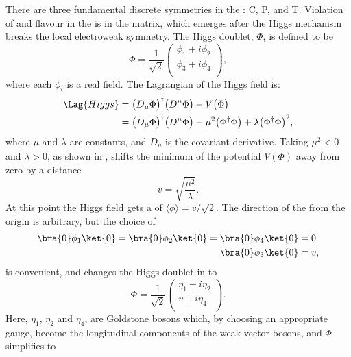 There are three fundamental discrete symmetries in the \sm: \gls{C}, \gls{P}, and \gls{T}.
Violation of \CP and flavour in the \sm is in the \ckm matrix, which emerges
after the Higgs mechanism breaks the local electroweak symmetry.
The Higgs doublet, $\Phi$, is defined to be
\begin{equation}
  \Phi = \frac{1}{\sqrt{2}}
  \begin{pmatrix}
    \phi_1 + i\phi_2 \\
    \phi_3 + i\phi_4 \\
  \end{pmatrix},
  \label{eq:th:phi}
\end{equation}
where each $\phi_i$ is a real field.
The Lagrangian of the Higgs field is:
\begin{align}
  \Lag{Higgs}
  &= \big(D_\mu\Phi\big)^\dagger\big(D^\mu\Phi\big) - V\big(\Phi\big) \nonumber\\
  &= \big(D_\mu\Phi\big)^\dagger\big(D^\mu\Phi\big) - \mu^2\big(\Phi^\dagger\Phi\big) +
  \lambda\big(\Phi^\dagger\Phi\big)^{2},
  \label{eq:th:laghiggs1}
\end{align}
where $\mu$ and $\lambda$ are constants, and $D_\mu$ is the covariant derivative.
Taking $\mu^2<0$ and $\lambda>0$,
as shown in ,
shifts the minimum of the potential $V(\Phi)$ away from zero by a
distance
\begin{equation}
  v = \sqrt{\frac{\mu^2}{\lambda}}.
\end{equation}
At this point the Higgs field gets a \VEV of $\langle\phi\rangle = v/\sqrt{2}$.
The direction of the \VEV from the origin is arbitrary, but the choice of
\begin{align}
  \bra{0}\phi_1\ket{0} =
  \bra{0}\phi_2\ket{0} =
  \bra{0}\phi_4\ket{0} &= 0 \nonumber\\
  \bra{0}\phi_3\ket{0} &= v,
\end{align}
is convenient, and changes the Higgs doublet in  to
\begin{equation}
  \Phi = \frac{1}{\sqrt{2}}
  \begin{pmatrix}
    \eta_1 + i\eta_2 \\
    v + i\eta_4 \\
  \end{pmatrix}.
  \label{eq:th:eta}
\end{equation}
Here, $\eta_1$, $\eta_2$ and $\eta_4$, are Goldstone bosons which, by choosing an appropriate
gauge, become the longitudinal components of the weak vector bosons, and $\Phi$ simplifies to
